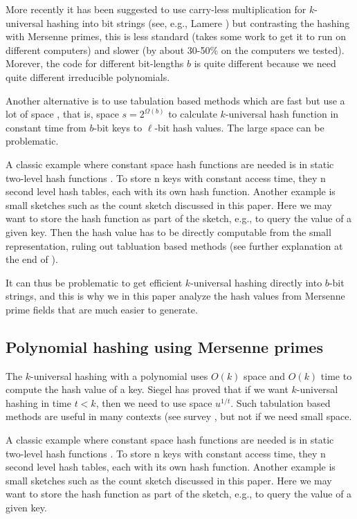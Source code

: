More recently it has been suggested to use carry-less multiplication
for $k$-universal hashing into bit strings (see, e.g., Lamere
\cite{Lamere14}) but contrasting the hashing with Mersenne primes,
this is less standard (takes some work to get it to run on different
computers) and slower (by about 30-50\% on the computers we tested).
Morever, the code for different bit-lengths $b$ is quite different
because we need quite different irreducible polynomials.

Another alternative is to use tabulation based methods which are fast
but use a lot of space \cite{Siegel04,Tho13:simple-simple}, that is,
space $s=2^{\Omega(b)}$ to calculate $k$-universal hash function in
constant time from $b$-bit keys to $\ell$-bit hash values. The large
space can be problematic.

A classic example where constant space hash
functions are needed is in static two-level hash functions
\cite{FKS84}.  To store n keys with constant access time, they n
second level hash tables, each with its own hash function.  Another
example is small sketches such as the count sketch
\cite{charikar04count-sketch} discussed in this paper. Here we may
want to store the hash function as part of the sketch, e.g., to query
the value of a given key. Then the hash value has to be directly
computable from the small representation, ruling out tabluation based
methods (see further explanation at the end of ).


It can thus be problematic to get efficient $k$-universal hashing directly into
$b$-bit strings, and this is why we in this paper analyze the
hash values from Mersenne prime fields that are much easier to generate.

\subsection{Polynomial hashing using Mersenne primes}

The $k$-universal hashing with a polynomial uses $O(k)$ space and $O(k)$ time
to compute the hash value of a key. Siegel \cite{Siegel04} has proved that if we want $k$-universal hashing in time $t<k$, then we need to use space $u^{1/t}$.
Such tabulation based methods are useful in many contexts (see survey \cite{Thorup17}, but not if we need small space.

A classic example where constant space hash functions are needed is in
static two-level hash functions \cite{FKS84}.  To store n keys with
constant access time, they n second level hash tables, each with its
own hash function.  Another example is small sketches such as the
count sketch \cite{charikar04count-sketch} discussed in this
paper. Here we may want to store the hash function as part of the
sketch, e.g., to query the value of a given key.


